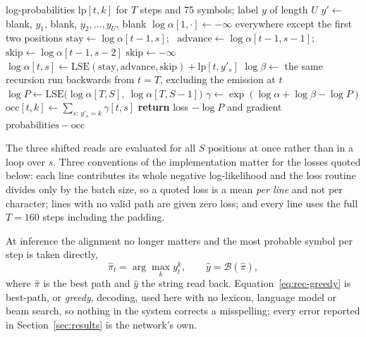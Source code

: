 \begin{algorithm}[!htbp]
\caption{The CTC forward recursion and the loss gradient}
\label{alg:rec-ctc}
\begin{algorithmic}[1]
\REQUIRE log-probabilities $\mathrm{lp}[t,k]$ for $T$ steps and 75 symbols; label $y$ of length $U$
\STATE $y'\leftarrow$ blank, $y_1$, blank, $y_2,\ldots,y_U$, blank 
\STATE $\log\alpha[1,\cdot]\leftarrow-\infty$ everywhere except the first two positions
        \STATE $\mathrm{stay}\leftarrow\log\alpha[t-1,s]$; \ $\mathrm{advance}\leftarrow\log\alpha[t-1,s-1]$; \ $\mathrm{skip}\leftarrow\log\alpha[t-1,s-2]$
            \STATE $\mathrm{skip}\leftarrow-\infty$ 
        \ENDIF
        \STATE $\log\alpha[t,s]\leftarrow\mathrm{LSE}(\mathrm{stay},\mathrm{advance},\mathrm{skip})+\mathrm{lp}[t,y'_s]$
    \ENDFOR
\ENDFOR
\STATE $\log\beta\leftarrow$ the same recursion run backwards from $t=T$, excluding the emission at $t$
\STATE $\log P\leftarrow\mathrm{LSE}\bigl(\log\alpha[T,S],\ \log\alpha[T,S-1]\bigr)$
\STATE $\gamma\leftarrow\exp(\log\alpha+\log\beta-\log P)$
\STATE $\mathrm{occ}[t,k]\leftarrow\sum_{s:\,y'_s=k}\gamma[t,s]$ 
\STATE \textbf{return} loss $-\log P$ and gradient $\mathrm{probabilities}-\mathrm{occ}$
\end{algorithmic}
\end{algorithm}

The three shifted reads are evaluated for all $S$ positions at once rather than in a loop over $s$. Three conventions of the implementation matter for the losses quoted below: each line contributes its whole negative log-likelihood and the loss routine divides only by the batch size, so a quoted loss is a mean \emph{per line} and not per character; lines with no valid path are given zero loss; and every line uses the full $T=160$ steps including the padding.

At inference the alignment no longer matters and the most probable symbol per step is taken directly,
\begin{equation}
\hat\pi_t=\arg\max_k y_t^k,\qquad \hat y=\mathcal B(\hat\pi),
\label{eq:rec-greedy}
\end{equation}
where $\hat\pi$ is the best path and $\hat y$ the string read back. Equation~\ref{eq:rec-greedy} is best-path, or \emph{greedy}, decoding, used here with no lexicon, language model or beam search, so nothing in the system corrects a misspelling; every error reported in Section~\ref{sec:results} is the network's own.

